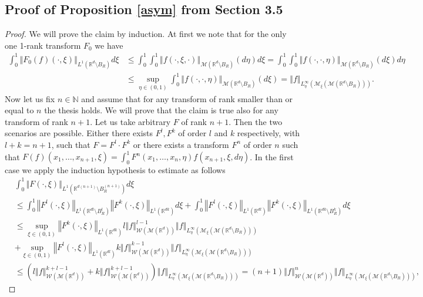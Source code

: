 \documentclass[10pt]{article}
\newcommand*{\norm}[1]{\left\Vert{#1}\right\Vert}
\newcommand{\R}{\mathbb{R}}
\newcommand{\izj}{\int_{0}^{1}}
\newcommand{\W}{\mathcal{W}}
\begin{document}
\subsection{ Proof of Proposition \ref{asym} from Section 3.5}
\begin{proof}
We will prove the claim by induction. At first we note that for the only one 1-rank transform $F_0$ we have
\begin{align*}
\izj \norm{F_0(f)(\cdot,\xi)}_{L^{1}(\R^d\setminus B_R)}d\xi &\leq \izj \izj \norm{f(\cdot,\xi,\cdot)}_{\mathcal{M}(\R^d\setminus B_R)}(d\eta) d\xi =
  \izj \izj \norm{f(\cdot,\cdot,\eta)}_{\mathcal{M}(\R^d\setminus B_R)}(d\xi) d\eta \\
&  \leq \sup_{\eta \in (0,1)}\izj \norm{f(\cdot,\cdot,\eta)}_{\mathcal{M}(\R^d\setminus B_R)}(d\xi) =\norm{f}_{L^{\infty}_\eta(\mathcal{M}_\xi(\mathcal{M}(\R^d\setminus B_R)))}.
\end{align*}
Now let us fix $n \in \mathbb{N}$ and assume that for any transform of rank smaller than or equal to $n$ the thesis holds. We will prove that the claim is true also for any transform of rank $n+1$. Let us take arbitrary $F$ of rank $n+1$. Then the two scenarios are possible. Either there exists  $F^l,F^k$ of order $l$ and $k$
respectively, with $l+k = n+1$, such that $F = F^l\cdot F^k$ or there exists a transform $F^n$ of order $n$
such that $F(f)(x_1,\dots,x_{n+1},\xi) = \izj F^{n}(x_1,\dots,x_n,\eta)f(x_{n+1},\xi,d\eta)$. In the first case we apply the induction hypothesis to estimate as follows
\begin{align*}
    &\izj \norm{F(\cdot,\xi)}_{L^{1}(\R^{d(n+1)}\setminus B_R^{(n+1)})}d\xi \\& \leq 
\izj \norm{F^l(\cdot,\xi)}_{L^{1}(\R^{dl}\setminus B_R^{l})}\norm{F^k(\cdot,\xi)}_{L^{1}(\R^{dk})}d\xi + \izj \norm{F^l(\cdot,\xi)}_{L^{1}(\R^{dl})}\norm{F^k(\cdot,\xi)}_{L^{1}(\R^{dk}\setminus B_R^k)}d\xi \\
&\leq\sup_{\xi \in (0,1)}\norm{F^k(\cdot,\xi)}_{L^{1}(\R^{dk})} l \norm{f}_{\W(\mathcal{M}(\R^d))}^{l-1}\norm{f}_{L^{\infty}_{\eta}(\mathcal{M}_\xi(\mathcal{M}(\R^d\setminus B_R)))} 
\\
&+
\sup_{\xi \in (0,1)}\norm{F^l(\cdot,\xi)}_{L^{1}(\R^{dl})} k \norm{f}_{\W(\mathcal{M}(\R^d))}^{k-1}\norm{f}_{L^{\infty}_{\eta}(\mathcal{M}_\xi(\mathcal{M}(\R^d\setminus B_R)))} 
\\
&\leq \left(l \norm{f}^{k+l-1}_{\W(\mathcal{M}(\R^d))}
+ k \norm{f}^{k+l-1}_{\W(\mathcal{M}(\R^d))}\right)\norm{f}_{L^{\infty}_{\eta}(\mathcal{M}_\xi(\mathcal{M}(\R^d\setminus B_R)))}  = (n+1)\norm{f}^{n}_{\W(\mathcal{M}(\R^d))}\norm{f}_{L^{\infty}_{\eta}(\mathcal{M}_\xi(\mathcal{M}(\R^d\setminus B_R)))}, 

\end{align*}
\end{proof}
\end{document}
